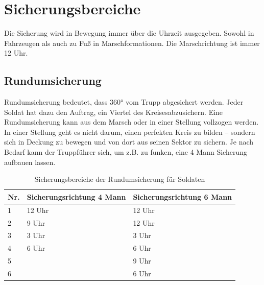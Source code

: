 \pagebreak

\section{Sicherungsbereiche}
Die Sicherung wird in Bewegung immer über die Uhrzeit ausgegeben. Sowohl in Fahrzeugen als auch zu Fuß in Marschformationen. Die Marschrichtung ist immer 12 Uhr.

\subsection{Rundumsicherung}
Rundumsicherung bedeutet, dass 360° vom Trupp abgesichert werden. Jeder Soldat hat dazu den Auftrag, ein Viertel des \glqq Kreises\grqq\space abzusichern. Eine Rundumsicherung kann aus dem Marsch oder in einer Stellung vollzogen werden. In einer Stellung geht es nicht darum, einen perfekten Kreis zu bilden – sondern sich in Deckung zu bewegen und von dort aus seinen Sektor zu sichern. Je nach Bedarf kann der Truppführer sich, um z.B. zu funken, eine 4 Mann Sicherung aufbauen lassen.
\begin{table}[h]	
	\caption{Sicherungsbereiche der Rundumsicherung für Soldaten}
	\vspace{2.5mm}
	\label{tab:360er}
	\centering
	\begin{tabular}{lll}
		\toprule
		Nr. & Sicherungsrichtung 4 Mann & Sicherungsrichtung 6 Mann\\
		\midrule
		1 & 12 Uhr 	& 12 Uhr\\
		2 & 9 Uhr	& 12 Uhr\\
		3 & 3 Uhr	& 3 Uhr\\
		4 & 6 Uhr	& 6 Uhr\\
		5 &			& 9 Uhr\\
		6 &			& 6 Uhr\\
		\bottomrule
	 \end{tabular}
\end{table}
		
\begin{figure}[h]
	\centering
	\label{fig:360er}
\end{figure}

